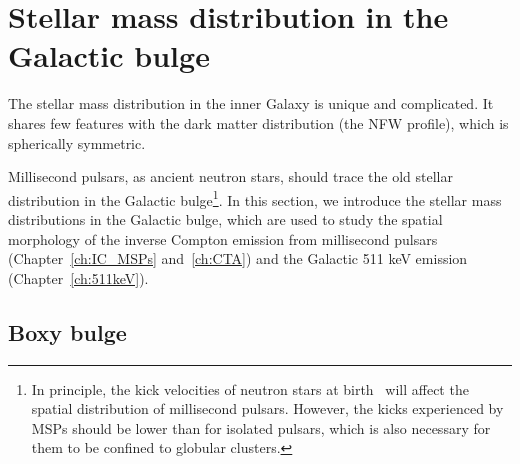 \documentclass[doublespace,nopageskip]{VTthesis}
\begin{document}
\section{Stellar mass distribution in the Galactic bulge}\label{se:bulge_model}

The stellar mass distribution in the inner Galaxy is unique and complicated. It shares few features with the dark matter distribution (the NFW profile), which is spherically symmetric.

Millisecond pulsars, as ancient neutron stars, should trace the old stellar distribution in the Galactic bulge\footnote{In principle, the kick velocities of neutron stars at birth~\cite{2018ApJ...862...79E} will affect the spatial distribution of millisecond pulsars. However, the kicks experienced by MSPs should be lower than for isolated pulsars, which is also necessary for them to be confined to globular clusters.}. In this section, we introduce the stellar mass distributions in the Galactic bulge, which are used to study the spatial morphology of the inverse Compton emission from millisecond pulsars (Chapter~\ref{ch:IC_MSPs} and~\ref{ch:CTA}) and the Galactic 511 keV emission (Chapter~\ref{ch:511keV}).

\subsection{Boxy bulge}
\end{document}
